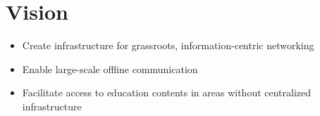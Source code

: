 \section{Vision}

\begin{frame}
    \begin{itemize}
        \item Create infrastructure for grassroots, information-centric networking
        \item Enable large-scale offline communication
        \item Facilitate access to education contents in areas without centralized infrastructure
    \end{itemize}
 \end{frame}